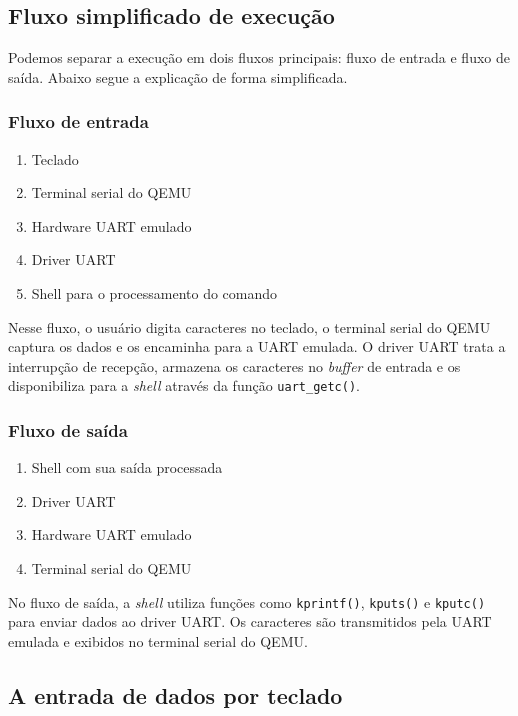 \subsection{Fluxo simplificado de execução}
Podemos separar a execução em dois fluxos principais: fluxo de entrada e fluxo de saída. Abaixo segue a explicação de forma simplificada.

\subsubsection{Fluxo de entrada}

\begin{enumerate}
    \item Teclado
    \item Terminal serial do QEMU
    \item Hardware UART emulado
    \item Driver UART
    \item Shell para o processamento do comando 
\end{enumerate}

Nesse fluxo, o usuário digita caracteres no teclado, o terminal serial do QEMU captura os dados e os encaminha para a UART emulada. O driver UART trata a interrupção de recepção, armazena os caracteres no \textit{buffer} de entrada e os disponibiliza para a \textit{shell} através da função \texttt{uart\_getc()}.

\subsubsection{Fluxo de saída}

\begin{enumerate}
    \item Shell com sua saída processada
    \item Driver UART
    \item Hardware UART emulado
    \item Terminal serial do QEMU
\end{enumerate}

No fluxo de saída, a \textit{shell} utiliza funções como \texttt{kprintf()}, \texttt{kputs()} e \texttt{kputc()} para enviar dados ao driver UART. Os caracteres são transmitidos pela UART emulada e exibidos no terminal serial do QEMU.

\subsection{A entrada de dados por teclado}

